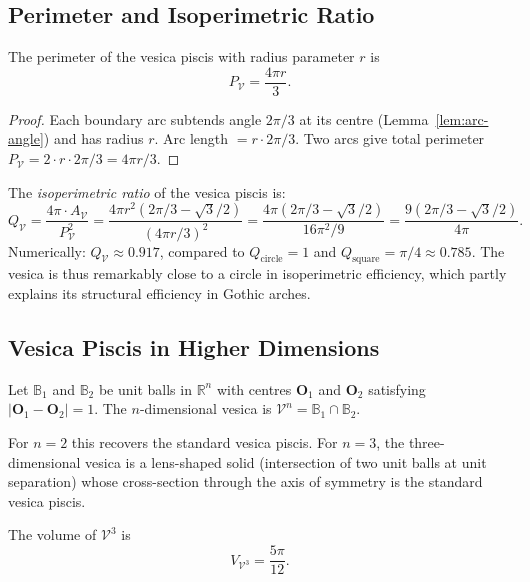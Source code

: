 \subsection{Perimeter and Isoperimetric Ratio}
\label{subsec:ch11-isoperimetric}

\begin{proposition}\label{prop:perimeter}
The perimeter of the vesica piscis with radius parameter \(r\) is
\[
  P_{\mathcal{V}} = \frac{4\pi r}{3}.
\]
\end{proposition}

\begin{proof}
Each boundary arc subtends angle \(2\pi/3\) at its centre
(Lemma~\ref{lem:arc-angle}) and has radius \(r\).
Arc length \(= r \cdot 2\pi/3\).
Two arcs give total perimeter \(P_{\mathcal{V}} = 2 \cdot r \cdot 2\pi/3 = 4\pi r/3\).
\end{proof}

The \emph{isoperimetric ratio} of the vesica piscis is:
\[
  Q_{\mathcal{V}} = \frac{4\pi \cdot A_{\mathcal{V}}}{P_{\mathcal{V}}^2}
  = \frac{4\pi r^2 (2\pi/3 - \sqrt{3}/2)}{(4\pi r/3)^2}
  = \frac{4\pi (2\pi/3 - \sqrt{3}/2)}{16\pi^2/9}
  = \frac{9(2\pi/3 - \sqrt{3}/2)}{4\pi}.
\]
Numerically: \(Q_{\mathcal{V}} \approx 0.917\), compared to \(Q_{\text{circle}} = 1\) and
\(Q_{\text{square}} = \pi/4 \approx 0.785\).
The vesica is thus remarkably close to a circle in isoperimetric efficiency,
which partly explains its structural efficiency in Gothic arches.

\subsection{Vesica Piscis in Higher Dimensions}
\label{subsec:ch11-higher-dim}

\begin{definition}
Let \(\mathbb{B}_1\) and \(\mathbb{B}_2\) be unit balls in
\(\mathbb{R}^n\) with centres \(\mathbf{O}_1\) and \(\mathbf{O}_2\)
satisfying \(|\mathbf{O}_1 - \mathbf{O}_2| = 1\).
The \(n\)-dimensional vesica is
\(\mathcal{V}^n = \mathbb{B}_1 \cap \mathbb{B}_2\).
\end{definition}

For \(n=2\) this recovers the standard vesica piscis.
For \(n=3\), the three-dimensional vesica is a lens-shaped solid
(intersection of two unit balls at unit separation) whose cross-section
through the axis of symmetry is the standard vesica piscis.

\begin{proposition}\label{prop:3d-volume}
The volume of \(\mathcal{V}^3\) is
\[
  V_{\mathcal{V}^3} = \frac{5\pi}{12}.
\]
\end{proposition}

